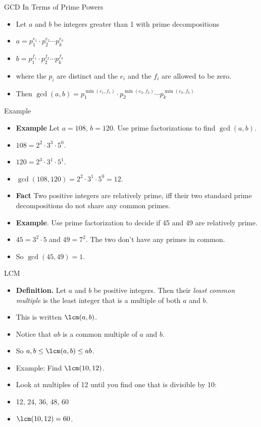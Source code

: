 \documentclass{beamer}
\begin{document}
\begin{frame}{GCD In Terms of Prime Powers}

\begin{itemize}
  \item Let $a$ and $b$ be integers greater than 1 with prime decompositions
  \item $a=p_1^{e_1} \cdot p_2^{e_2} \cdots p_k^{e_k}$
  \item $b=p_1^{f_1} \cdot p_2^{f_2} \cdots p_k^{f_k}$
  \item where the $p_i$ are distinct and the $e_i$ and the $f_i$ are allowed to be zero.
  \item Then $\gcd(a,b) = p_1^{\min(e_1,f_1)} \cdot p_2^{\min(e_2,f_2)} \cdots p_k^{\min(e_k,f_k)}$
\end{itemize}

\end{frame}

\begin{frame}{Example}

\begin{itemize}
  \item \textbf{Example} Let $a=108$, $b=120$. Use prime factorizations to find $\gcd(a,b)$.
  \item $108 =  2^2 \cdot 3^3 \cdot 5^0$.
  \item $120 =  2^3 \cdot 3^1 \cdot 5^1$.
  \item $\gcd(108,120) = 2^2\cdot 3^1 \cdot 5^0 = 12$.
  \item \textbf{Fact} Two positive integers are relatively prime, iff their two standard prime
  decompositions do not share any common primes.
  \item \textbf{Example}. Use prime factorization to decide if 45 and 49 are relatively prime.
  \item $45 = 3^2 \cdot 5$ and $49 = 7^2$. The two don't have any primes in common.
  \item So $\gcd(45,49) = 1$.
\end{itemize}

\end{frame}

\begin{frame}{LCM}

\begin{itemize}
  \item \textbf{Definition.} Let $a$ and $b$ be positive integers.
  Then their \emph{least common multiple} is the least integer that is
  a multiple of both $a$ and $b$.
  \item This is written $\lcm(a,b)$.
  \item Notice that $ab$ is a common multiple of $a$ and $b$.
  \item So $a,b\leq \lcm(a,b) \leq ab$.
  \item Example: Find $\lcm(10,12)$.
  \item Look at multiples of 12 until you find one that is divisible by 10:
  \item 12, 24, 36, 48, 60
  \item $\lcm(10,12) = 60$.
\end{itemize}

\end{frame}
\end{document}
